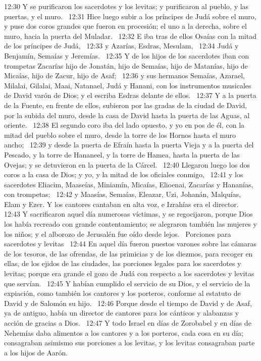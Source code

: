 12:30 Y se purificaron los sacerdotes y los levitas; y purificaron al pueblo, y las puertas, y el muro.  
12:31 Hice luego subir a los príncipes de Judá sobre el muro, y puse dos coros grandes que fueron en procesión; el uno a la derecha, sobre el muro, hacia la puerta del Muladar.  
12:32 E iba tras de ellos Osaías con la mitad de los príncipes de Judá,  
12:33 y Azarías, Esdras, Mesulam,  
12:34 Judá y Benjamín, Semaías y Jeremías.  
12:35 Y de los hijos de los sacerdotes iban con trompetas Zacarías hijo de Jonatán, hijo de Semaías, hijo de Matanías, hijo de Micaías, hijo de Zacur, hijo de Asaf;  
12:36 y sus hermanos Semaías, Azarael, Milalai, Gilalai, Maai, Natanael, Judá y Hanani, con los instrumentos musicales de David varón de Dios; y el escriba Esdras delante de ellos.  
12:37 Y a la puerta de la Fuente, en frente de ellos, subieron por las gradas de la ciudad de David, por la subida del muro, desde la casa de David hasta la puerta de las Aguas, al oriente.  
12:38 El segundo coro iba del lado opuesto, y yo en pos de él, con la mitad del pueblo sobre el muro, desde la torre de los Hornos hasta el muro ancho;  
12:39 y desde la puerta de Efraín hasta la puerta Vieja y a la puerta del Pescado, y la torre de Hananeel, y la torre de Hamea, hasta la puerta de las Ovejas; y se detuvieron en la puerta de la Cárcel.  
12:40 Llegaron luego los dos coros a la casa de Dios; y yo, y la mitad de los oficiales conmigo,  
12:41 y los sacerdotes Eliacim, Maaseías, Miniamín, Micaías, Elioenai, Zacarías y Hananías, con trompetas;  
12:42 y Maasías, Semaías, Eleazar, Uzi, Johanán, Malquías, Elam y Ezer. Y los cantores cantaban en alta voz, e Izrahías era el director.  
12:43 Y sacrificaron aquel día numerosas víctimas, y se regocijaron, porque Dios los había recreado con grande contentamiento; se alegraron también las mujeres y los niños; y el alborozo de Jerusalén fue oído desde lejos.  
Porciones para sacerdotes y levitas  
12:44 En aquel día fueron puestos varones sobre las cámaras de los tesoros, de las ofrendas, de las primicias y de los diezmos, para recoger en ellas, de los ejidos de las ciudades, las porciones legales para los sacerdotes y levitas; porque era grande el gozo de Judá con respecto a los sacerdotes y levitas que servían.  
12:45 Y habían cumplido el servicio de su Dios, y el servicio de la expiación, como también los cantores y los porteros, conforme al estatuto de David y de Salomón su hijo.  
12:46 Porque desde el tiempo de David y de Asaf, ya de antiguo, había un director de cantores para los cánticos y alabanzas y acción de gracias a Dios.  
12:47 Y todo Israel en días de Zorobabel y en días de Nehemías daba alimentos a los cantores y a los porteros, cada cosa en su día; consagraban asimismo sus porciones a los levitas, y los levitas consagraban parte a los hijos de Aarón.  
